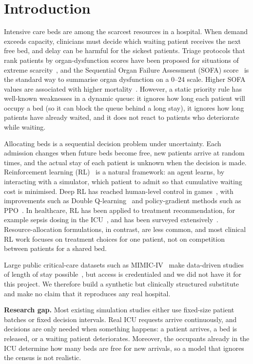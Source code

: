 \documentclass{rlreport}
\begin{document}
\section{Introduction}
Intensive care beds are among the scarcest resources in a hospital. When demand exceeds capacity, clinicians must decide which waiting patient receives the next free bed, and delay can be harmful for the sickest patients. Triage protocols that rank patients by organ-dysfunction scores have been proposed for situations of extreme scarcity~\cite{christian2006triage}, and the Sequential Organ Failure Assessment (SOFA) score~\cite{vincent1996sofa,singer2016sepsis3} is the standard way to summarise organ dysfunction on a 0--24 scale. Higher SOFA values are associated with higher mortality~\cite{ferreira2001serial}. However, a static priority rule has well-known weaknesses in a dynamic queue: it ignores how long each patient will occupy a bed (so it can block the queue behind a long stay), it ignores how long patients have already waited, and it does not react to patients who deteriorate while waiting.

Allocating beds is a sequential decision problem under uncertainty. Each admission changes when future beds become free, new patients arrive at random times, and the actual stay of each patient is unknown when the decision is made. Reinforcement learning (RL)~\cite{sutton2018rl} is a natural framework: an agent learns, by interacting with a simulator, which patient to admit so that cumulative waiting cost is minimised. Deep RL has reached human-level control in games~\cite{mnih2015dqn}, with improvements such as Double Q-learning~\cite{vanhasselt2016ddqn} and policy-gradient methods such as PPO~\cite{schulman2017ppo}. In healthcare, RL has been applied to treatment recommendation, for example sepsis dosing in the ICU~\cite{komorowski2018aic}, and has been surveyed extensively~\cite{yu2021rlhealth}. Resource-allocation formulations, in contrast, are less common, and most clinical RL work focuses on treatment choices for one patient, not on competition between patients for a shared bed.

Large public critical-care datasets such as MIMIC-IV~\cite{johnson2023mimiciv} make data-driven studies of length of stay possible~\cite{harutyunyan2019benchmark}, but access is credentialed and we did not have it for this project. We therefore build a synthetic but clinically structured substitute and make no claim that it reproduces any real hospital.

\textbf{Research gap.} Most existing simulation studies either use fixed-size patient batches or fixed decision intervals. Real ICU requests arrive continuously, and decisions are only needed when something happens: a patient arrives, a bed is released, or a waiting patient deteriorates. Moreover, the occupants already in the ICU determine how many beds are free for new arrivals, so a model that ignores the census is not realistic.
\end{document}
